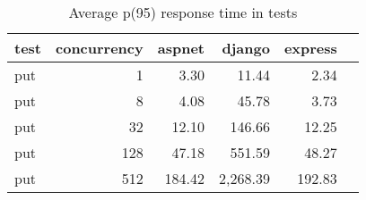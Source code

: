 \FloatBarrier
\begin{table}[!htp]\centering
    \caption{Average p(95) response time in tests}\label{tab:resultsPut}
    \scriptsize
    \begin{tabular}{lrrrrr}\toprule
        test & concurrency & aspnet & django   & express \\\midrule
        put  & 1           & 3.30   & 11.44    & 2.34    \\
        put  & 8           & 4.08   & 45.78    & 3.73    \\
        put  & 32          & 12.10  & 146.66   & 12.25   \\
        put  & 128         & 47.18  & 551.59   & 48.27   \\
        put  & 512         & 184.42 & 2,268.39 & 192.83  \\
        \bottomrule
    \end{tabular}
\end{table}
\FloatBarrier
